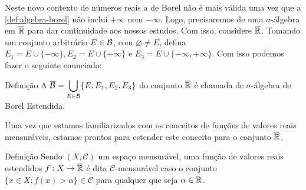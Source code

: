     Neste novo contexto de números reais a \sigal de Borel não é mais válida uma vez que a \ref{def:algebra-borel} não inclui $+\infty$ nem $-\infty$.
    Logo, precisaremos de uma $\sigma$-álgebra em $\operatorname{\overline{\mathbb{R}}}$ para dar continuidade aos nossos estudos. 
    Com isso, considere $\operatorname{\overline{\mathbb{R}}}$.
    Tomando um conjunto arbitrário $E \in \operatorname{\mathcal{B}}$, com $\varnothing \neq E$, defina $E_1 = E \cup \{-\infty\}, E_2 = E \cup \{+\infty\}$ e $E_3 = E \cup \{-\infty, +\infty\}$. Com isso podemos fazer o seguinte enunciado: 
    \begin{comment}
    Com efeito, se $E \in \borel$, então é um intervalo aberto conforme o teorema \ref{teo:equiv-borel}.
    Assim, $E_1, E_2, E_3$ e $E_4$ serão intervalos do tipo $[-\infty,x)$ ou $(x, +\infty]$ que são elementos de $\borel$ acrescidos de $+\infty$ ou $-\infty$. 
    Deste modo, é fácil verificar que se um elemento $A \in \xborel$, então $A^c \in \xborel$.
    Além disso, a união enumerável é, no máximo, o intervalo $[-\infty,+\infty]$ que é exatamente $\xreta$.
    Desta forma, $\xborel$ é uma \sigal de $\xreta$.
    	
    \end{comment}
    
    \begin{env}{Definição}
    \label{def:algebra-borel-estendida}
        A \sigal $\overline{\operatorname{\mathcal{B}}} = \displaystyle \bigcup_{E \in \operatorname{\mathcal{B}}} \{E, E_1, E_2, E_3\}$ do conjunto $\operatorname{\overline{\mathbb{R}}}$ é chamada de $\sigma$-álgebra de Borel Estendida.
    \end{env}

    Uma vez que estamos familiarizados com os conceitos de funções de valores reais mensuráveis, estamos prontos para estender este conceito para o conjunto $\operatorname{\overline{\mathbb{R}}}$.
    \begin{env}{Definição}
    \label{def:familia-funcoes-mensuraveis}
        Sendo $(X, \mathcal{C})$ um espaço mensurável, uma função de valores reais estendidos $f: X \to \operatorname{\overline{\mathbb{R}}}$ é dita $\mathcal{C}$-mensurável caso o conjunto
        $\{x \in X; f(x) > \alpha\} \in \mathcal{C}$ para qualquer que seja $\alpha \in \mathbb{R}$. 
        \vspace{-0.4cm}
    \end{env}

